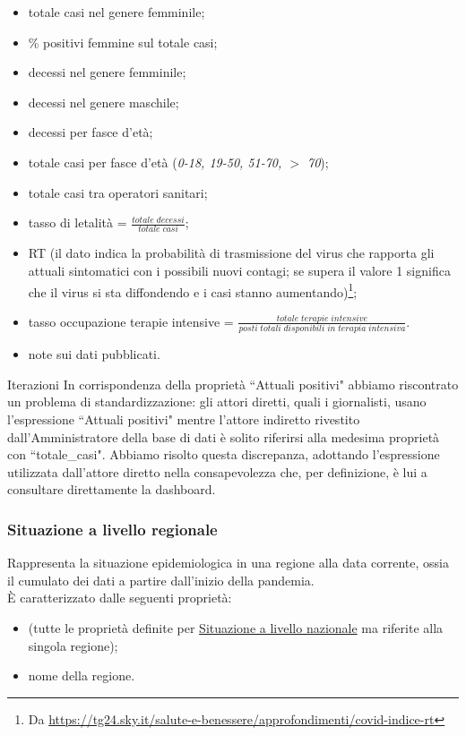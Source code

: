 \begin{itemize}
    \item totale casi nel genere femminile;
    \item \% positivi femmine sul totale casi;
    \item decessi nel genere femminile;
    \item decessi nel genere maschile;
    \item decessi per fasce d'età; 
    \item totale casi per fasce d'età (\textit{0-18, 19-50, 51-70, $>$ 70});
    \item totale casi tra operatori sanitari;
    \item tasso di letalità = $\frac{totale \; decessi}{totale \; casi}$;
    \item RT (il dato indica la probabilità di trasmissione del virus che rapporta gli attuali sintomatici con i possibili nuovi contagi; se supera il valore 1 significa che il virus si sta diffondendo e i casi stanno aumentando)\footnote{Da \href{https://tg24.sky.it/salute-e-benessere/approfondimenti/covid-indice-rt}{https://tg24.sky.it/salute-e-benessere/approfondimenti/covid-indice-rt}};
    \item tasso occupazione terapie intensive = $\frac{totale \; terapie \; intensive}{posti \; totali \; disponibili \; in \; terapia \; intensiva}$.
    \item note sui dati pubblicati.
\end{itemize}
\begin{bclogo}{Iterazioni}
    In corrispondenza della proprietà ``Attuali positivi" abbiamo riscontrato un problema di standardizzazione: gli attori diretti, quali i giornalisti, usano l'espressione ``Attuali positivi" mentre l'attore indiretto rivestito dall'Amministratore della base di dati è solito riferirsi alla medesima proprietà con ``totale\_casi". Abbiamo risolto questa discrepanza, adottando l'espressione utilizzata dall'attore diretto nella consapevolezza che, per definizione, è lui a consultare direttamente la dashboard.
\end{bclogo}

\subsubsection{Situazione a livello regionale}
\label{sss:situazione-livello-regionale}
Rappresenta la situazione epidemiologica in una regione alla data corrente, ossia il cumulato dei dati a partire dall'inizio della pandemia.\\
È caratterizzato dalle seguenti proprietà:
\begin{itemize}
    \item (tutte le proprietà definite per \hyperref[sss:situazione-livello-nazionale]{Situazione a livello nazionale} ma riferite alla singola regione);
    \item nome della regione.
\end{itemize}

